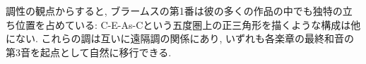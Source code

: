 調性の観点からすると, ブラームスの第1番は彼の多くの作品の中でも独特の立ち位置を占めている:
C-E-As-Cという五度圏上の正三角形を描くような構成は他にない.
これらの調は互いに遠隔調の関係にあり, いずれも各楽章の最終和音の第3音を起点として自然に移行できる.


